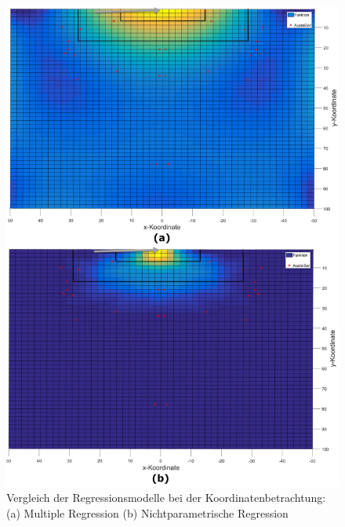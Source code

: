 \begin{figure}[H]
\centering
\includegraphics[scale=0.34]{se-wa-jpg/heatmap}
\caption[Vergleich der Regressionsmodelle bei der Koordinatenbetrachtung ]{Vergleich der Regressionsmodelle bei der Koordinatenbetrachtung: (a) Multiple Regression (b) Nichtparametrische Regression}
\label{heatmap}
\end{figure}